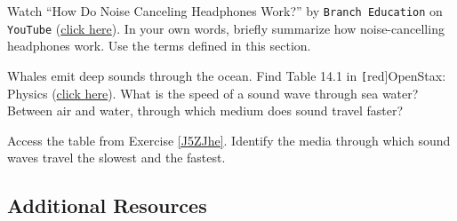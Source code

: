 \documentclass[main.tex]{subfiles}
\begin{document}
\begin{exercise}
    Watch ``How Do Noise Canceling Headphones Work?'' by \texttt{Branch Education} on \texttt{YouTube} (\href{https://youtu.be/VIi04uD8LtY}{click here}). In your own words, briefly summarize how noise-cancelling headphones work. Use the terms defined in this section.
\end{exercise}

\begin{exercise} \label{J5ZJhe}
    Whales emit deep sounds through the ocean. Find Table 14.1 in \texttt[red]{OpenStax: Physics} (\href{https://openstax.org/books/physics/pages/14-1-speed-of-sound-frequency-and-wavelength#Table_14_01}{click here}). What is the speed of a sound wave through sea water? Between air and water, through which medium does sound travel faster?
\end{exercise}

\begin{exercise}
    Access the table from Exercise \ref{J5ZJhe}. Identify the media through which sound waves travel the slowest and the fastest.
\end{exercise}







\clearpage

\subsection*{Additional Resources}
\end{document}
